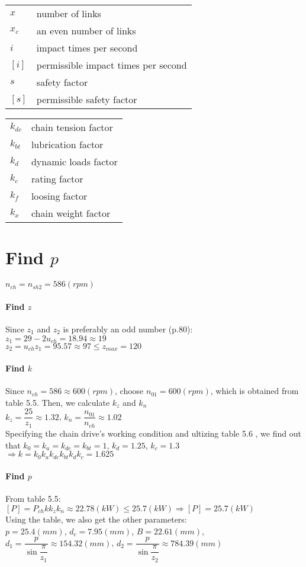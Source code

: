\begin{tabular}[t]{lp{7cm}}
	$ x $ & number of links\\
	$ x_c $ & an even number of links\\
	$ i $ & impact times per second\\
	$ [i] $ & permissible impact times per second\\
	$ s $ & safety factor\\
	$ [s] $ & permissible safety factor\\
\end{tabular}
\begin{tabular}[t]{lp{7cm}}
	$ k_{dc} $ & chain tension  factor\\
	$ k_{bt} $ & lubrication factor\\
	$ k_d $ & dynamic loads factor\\
	$ k_c $ & rating factor\\
	$ k_f $ & loosing factor\\
	$ k_x $ & chain weight factor\\
\end{tabular}
\section{Find $ p $}
$ n_{ch} = n_{sh2} = 586\unit{(rpm)} $
\paragraph{Find $ z $}Since $ z_1 $ and $ z_2 $ is preferably an odd number (p.80):\\
$ z_1 = 29 - 2u_{ch} = 18.94 \approx 19$\\
$ z_2 = u_{ch}z_1 = 95.57 \approx 97 \leq z_{max} = 120$
\paragraph{Find $ k $}Since $ n_{ch} = 586 \approx 600 \unit{(rpm)}$, choose $ n_{01} = 600\unit{(rpm)} $, which is obtained from table 5.5. Then, we calculate $ k_z $ and $ k_n $\\
$ k_z = \dfrac{25}{z_1} \approx 1.32$, 
$ k_n = \dfrac{n_{01}}{n_{ch}} \approx 1.02$\\
Specifying the chain drive's working condition and ultizing table 5.6 , we find out that $ k_0=k_a=k_{dc}=k_{bt}=1 $, $ k_d=1.25 $, $ k_c=1.3 $\\
$\Rightarrow k = k_0k_ak_{dc}k_{bt}k_dk_c = 1.625$
\paragraph{Find $ p $} From table 5.5:\\
$ [P] = P_{ch}kk_zk_n \approx 22.78\unit{(kW)} \leq 25.7\unit{(kW)} \Rightarrow [P] = 25.7 \unit{(kW)}$\\
Using the table, we also get the other parameters:\\
$ p=25.4\unit{(mm)}$, $d_c=7.95\unit{(mm)}$, $ B=22.61\unit{(mm)}$,\\
$ d_1=\dfrac{p}{\sin{\dfrac{\pi}{z_1}}} \approx 154.32\unit{(mm)} $, 
$ d_2=\dfrac{p}{\sin{\dfrac{\pi}{z_2}}} \approx  784.39\unit{(mm)}$
